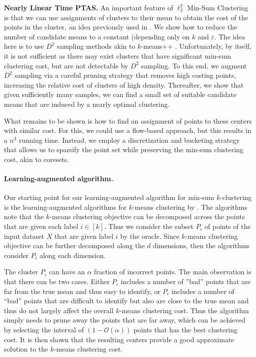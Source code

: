 \documentclass[10pt,a4paper]{amsart}
\renewcommand{\O}[1]{\ensuremath{\mathcal{O}\left(#1\right)}}
\begin{document}
\textbf{Nearly Linear Time PTAS.} An important feature of $\ell_2^2$ Min-Sum Clustering is that we can use assignments of clusters to their mean to obtain the cost of the points in the cluster, an idea previously used in \cite{Indyk99,Matousek00,Schulman00,VegaKKR03}. We show how to reduce the number of candidate means to a constant (depending only on $k$ and $\varepsilon$.
The idea here is to use $D^2$ sampling methods akin to $k$-means++ \cite{ArthurV07}. Unfortunately, by itself, it is not sufficient as there may exist clusters that have significant min-sum clustering cost, but are not detectable by $D^2$ sampling. To this end, we augment $D^2$ sampling via a careful pruning strategy that removes high costing points, increasing the relative cost of clusters of high density. 
Thereafter, we show that given sufficiently many samples, we can find a small set of suitable candidate means that are induced by a nearly optimal clustering.

What remains to be shown is how to find an assignment of points to these centers with similar cost. For this, we could use a flow-based approach, but this results in a $n^3$ running time. Instead, we employ a discretization and bucketing strategy that allows us to sparsify the point set while preserving the min-sum clustering cost, akin to coresets.

\paragraph{Learning-augmented algorithm.}
Our starting point for our learning-augmented algorithm for min-sum $k$-clustering is the learning-augmented algorithms for $k$-means clustering by \cite{ErgunFSWZ22,NguyenCN23}. 
The algorithms note that the $k$-means clustering objective can be decomposed across the points that are given each label $i\in[k]$. 
Thus we consider the subset $P_i$ of points of the input dataset $X$ that are given label $i$ by the oracle. 
Since $k$-means clustering objective can be further decomposed along the $d$ dimensions, then the algorithms consider $P_i$ along each dimension. 

The cluster $P_i$ can have an $\alpha$ fraction of incorrect points. 
The main observation is that there can be two cases. 
Either $P_i$ includes a number of ''bad'' points that are far from the true mean and thus easy to identify, or $P_i$ includes a number of ``bad'' points that are difficult to identify but also are close to the true mean and thus do not largely affect the overall $k$-means clustering cost. 
Thus the algorithm simply needs to prune away the points that are far away, which can be achieved by selecting the interval of $(1-\O{\alpha})$ points that has the best clustering cost. 
It is then shown that the resulting centers provide a good approximate solution to the $k$-means clustering cost. 
\end{document}

